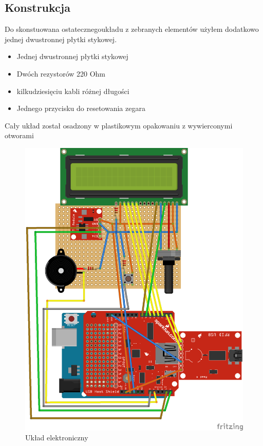 \documentclass[declaration,shortabstract, mgr]{iithesis}
\begin{document}
\subsection{Konstrukcja}
Do skonstuowana ostatecznegoukładu z zebranych elementów użyłem dodatkowo jednej dwustronnej płytki stykowej.
\begin{itemize}
\item Jednej dwustronnej płytki stykowej
\item Dwóch rezystorów 220 Ohm
\item kilkudziesięciu kabli różnej długości
\item Jednego przycisku do resetowania zegara
\end{itemize}
\indent Cały układ został osadzony w plastikowym opakowaniu z wywierconymi otworami\\
\begin{figure}[h]
\caption{Układ elektroniczny}
\centering
\includegraphics{circuit.png}
\end{figure}
\end{document}
